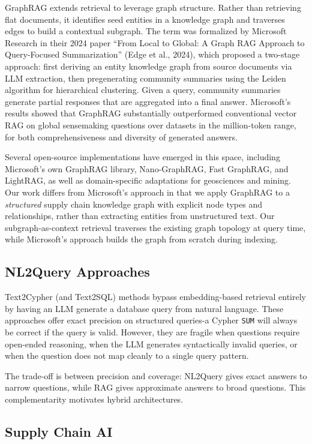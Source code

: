 \documentclass[11pt,a4paper]{article}
\begin{document}
GraphRAG extends retrieval to leverage graph structure. Rather than retrieving flat documents, it identifies seed entities in a knowledge graph and traverses edges to build a contextual subgraph. The term was formalized by Microsoft Research in their 2024 paper ``From Local to Global: A Graph RAG Approach to Query-Focused Summarization'' (Edge et al., 2024), which proposed a two-stage approach: first deriving an entity knowledge graph from source documents via LLM extraction, then pregenerating community summaries using the Leiden algorithm for hierarchical clustering. Given a query, community summaries generate partial responses that are aggregated into a final answer. Microsoft's results showed that GraphRAG substantially outperformed conventional vector RAG on global sensemaking questions over datasets in the million-token range, for both comprehensiveness and diversity of generated answers.

Several open-source implementations have emerged in this space, including Microsoft's own GraphRAG library, Nano-GraphRAG, Fast GraphRAG, and LightRAG, as well as domain-specific adaptations for geosciences and mining. Our work differs from Microsoft's approach in that we apply GraphRAG to a \textit{structured} supply chain knowledge graph with explicit node types and relationships, rather than extracting entities from unstructured text. Our subgraph-as-context retrieval traverses the existing graph topology at query time, while Microsoft's approach builds the graph from scratch during indexing.

\subsection{NL2Query Approaches}

Text2Cypher (and Text2SQL) methods bypass embedding-based retrieval entirely by having an LLM generate a database query from natural language. These approaches offer exact precision on structured queries-a Cypher \texttt{SUM} will always be correct if the query is valid. However, they are fragile when questions require open-ended reasoning, when the LLM generates syntactically invalid queries, or when the question does not map cleanly to a single query pattern.

The trade-off is between precision and coverage: NL2Query gives exact answers to narrow questions, while RAG gives approximate answers to broad questions. This complementarity motivates hybrid architectures.

\subsection{Supply Chain AI}
\end{document}

